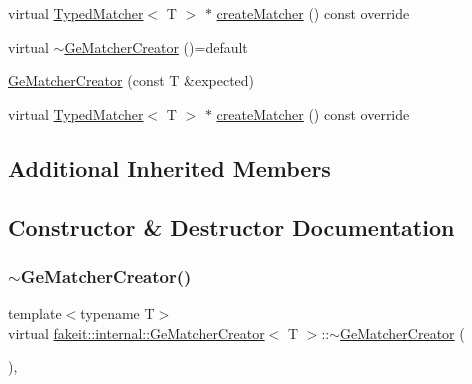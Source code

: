 \begin{DoxyCompactItemize}
virtual \mbox{\hyperlink{structfakeit_1_1TypedMatcher}{Typed\+Matcher}}$<$ T $>$ $\ast$ \mbox{\hyperlink{structfakeit_1_1internal_1_1GeMatcherCreator_abdd98f20fef3c4eae426d4f6e31e24b2}{create\+Matcher}} () const override
\item 
virtual \mbox{\hyperlink{structfakeit_1_1internal_1_1GeMatcherCreator_aede79743afe7c3709b869d12a81538f2}{$\sim$\+Ge\+Matcher\+Creator}} ()=default
\item 
\mbox{\hyperlink{structfakeit_1_1internal_1_1GeMatcherCreator_a71dea5672e8e0df897ed4a4f12e266ce}{Ge\+Matcher\+Creator}} (const T \&expected)
\item 
virtual \mbox{\hyperlink{structfakeit_1_1TypedMatcher}{Typed\+Matcher}}$<$ T $>$ $\ast$ \mbox{\hyperlink{structfakeit_1_1internal_1_1GeMatcherCreator_abdd98f20fef3c4eae426d4f6e31e24b2}{create\+Matcher}} () const override
\end{DoxyCompactItemize}
\subsection*{Additional Inherited Members}


\subsection{Constructor \& Destructor Documentation}
\mbox{\label{structfakeit_1_1internal_1_1GeMatcherCreator_aede79743afe7c3709b869d12a81538f2}} 
\subsubsection{\texorpdfstring{$\sim$GeMatcherCreator()}{~GeMatcherCreator()}\hspace{0.1cm}{\footnotesize\ttfamily [1/9]}}
{\footnotesize\ttfamily template$<$typename T$>$ \\
virtual \mbox{\hyperlink{structfakeit_1_1internal_1_1GeMatcherCreator}{fakeit\+::internal\+::\+Ge\+Matcher\+Creator}}$<$ T $>$\+::$\sim$\mbox{\hyperlink{structfakeit_1_1internal_1_1GeMatcherCreator}{Ge\+Matcher\+Creator}} (\begin{DoxyParamCaption}{ }\end{DoxyParamCaption})\hspace{0.3cm}{\ttfamily [virtual]}, {\ttfamily [default]}}

